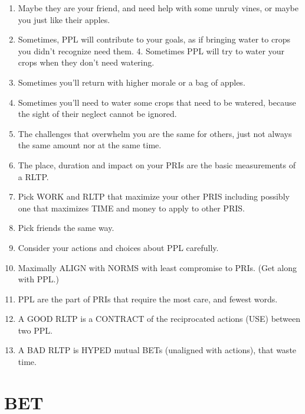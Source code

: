 \documentclass[
]{book}
\begin{document}
\begin{enumerate}
\def\labelenumi{\arabic{enumi}.}
\setcounter{enumi}{27}
\item
  Maybe they are your friend, and need help with some unruly vines, or maybe you just like their apples.
\item
  Sometimes, PPL will contribute to your goals, as if bringing water to crops you didn't recognize need them. 4. Sometimes PPL will try to water your crops when they don't need watering.
\item
  Sometimes you'll return with higher morale or a bag of apples.
\item
  Sometimes you'll need to water some crops that need to be watered, because the sight of their neglect cannot be ignored.
\item
  The challenges that overwhelm you are the same for others, just not always the same amount nor at the same time.
\item
  The place, duration and impact on your PRIs are the basic measurements of a RLTP.
\item
  Pick WORK and RLTP that maximize your other PRIS including possibly
  one that maximizes TIME and money to apply to other PRIS.
\item
  Pick friends the same way.
\item
  Consider your actions and choices about PPL carefully.
\item
  Maximally ALIGN with NORMS with least compromise to PRIs. (Get along with PPL.)
\item
  PPL are the part of PRIs that require the most care, and fewest words.
\item
  A GOOD RLTP is a CONTRACT of the reciprocated actions (USE) between two PPL.
\item
  A BAD RLTP is HYPED mutual BETs (unaligned with actions), that waste time.
\end{enumerate}

\hypertarget{bet}{%
\chapter{BET}\label{bet}}
\end{document}
